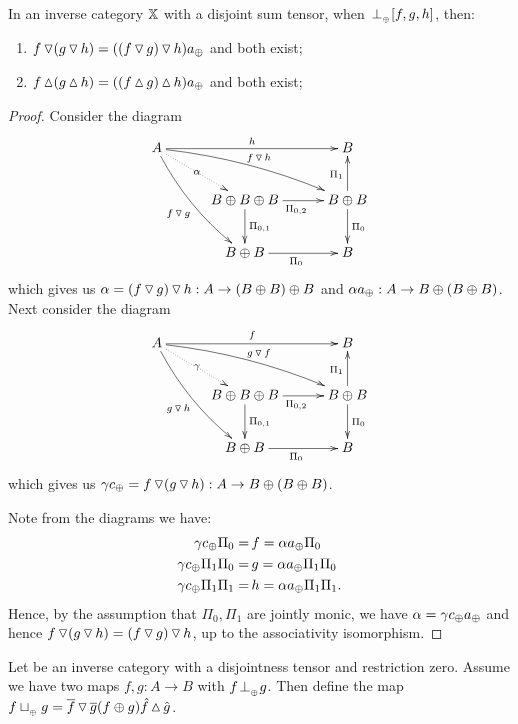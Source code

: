 \begin{lemma}\label{lem:tjleft_and_tjright_associate}
  In an inverse category $\mathbb{X}$ with a disjoint sum tensor, when ${}_{{}_{}}{\perp_{{}_{\oplus}}} [f,g,h]$, then:
  \begin{enumerate}
    \item   $f \operatorname{\triangledown} (g \operatorname{\triangledown} h) = ((f \operatorname{\triangledown} g) \operatorname{\triangledown} h) a_{\oplus}$ and both exist;
    \item   $f \operatorname{\vartriangle} (g \operatorname{\vartriangle} h) = ((f \operatorname{\vartriangle} g) \operatorname{\vartriangle} h) a_{\oplus}$ and both exist;
  \end{enumerate}
\end{lemma}
\begin{proof}
  Consider the diagram
  \[
    \xymatrix@C+5pt{
      A \ar@/_/[ddr]_{f\tjleft g} \ar@/^/[drr]^{f\tjleft h} \ar@{.>}[dr]|-{\alpha} \ar[rr]^{h}
        & & B \\
        & B\+B\+B \ar[d]^{\Pi_{0,1}} \ar[r]_{\Pi_{0,2}} & B\+B \ar[d]^{\Pi_0} \ar[u]^{\Pi_1} \\
        & B\+B \ar[r]_{\Pi_0} & B
    }
  \]
  which gives us $\alpha = (f \operatorname{\triangledown} g) \operatorname{\triangledown} h: A \to (B\oplus B)\oplus B$ and
  $\alpha a_{\oplus} :A \to B\oplus(B\oplus B)$. Next consider the diagram
  \[
    \xymatrix@C+5pt{
      A \ar@/_/[ddr]_{g\tjleft h} \ar@/^/[drr]^{g\tjleft f} \ar@{.>}[dr]|-{\gamma} \ar[rr]^{f}
        & & B \\
        & B\+B\+B \ar[d]^{\Pi_{0,1}} \ar[r]_{\Pi_{0,2}} & B\+B \ar[d]^{\Pi_0} \ar[u]^{\Pi_1} \\
        & B\+B \ar[r]_{\Pi_0} & B
    }
  \]
  which gives us $\gamma c_{\oplus} = f \operatorname{\triangledown} (g\operatorname{\triangledown} h): A \to B\oplus(B\oplus B)$.

  Note from the diagrams we have:
  \begin{align*}
    \gamma c_{\oplus}  \Pi_{0}         =\, &f  = \alpha a_{\oplus}\Pi_0\\
    \gamma c_{\oplus}  \Pi_{1} \Pi_{0} =\, &g  = \alpha a_{\oplus}\Pi_1\Pi_0\\
    \gamma c_{\oplus}  \Pi_{1} \Pi_1   =\, & h = \alpha a_{\oplus}\Pi_1\Pi_1.
  \end{align*}
  Hence, by the assumption that $\Pi_0, \Pi_1$ are jointly monic, we have
  $\alpha = \gamma c_{\oplus}  a_{\oplus}$ and hence $f \operatorname{\triangledown} (g \operatorname{\triangledown} h) = (f \operatorname{\triangledown} g) \operatorname{\triangledown} h$,
  up to the associativity isomorphism.
\end{proof}
\begin{definition}\label{def:tensor_disjoint_join}
  Let \X be an inverse category with a disjointness tensor and restriction zero. Assume we have two
  maps $f,g: A \to B$ with $f{}_{{}_{}}{\perp_{{}_{\oplus}}} g$. Then define the map $f \sqcup_{{_{\oplus}}} g = \overline{f}\operatorname{\triangledown}\overline{g}
  (f\oplus g) \hat{f}\operatorname{\vartriangle}\hat{g}$.
\end{definition}


